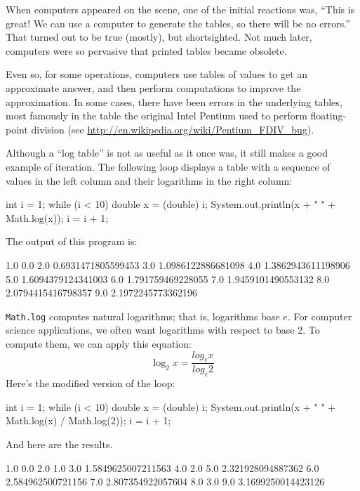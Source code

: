 \documentclass[12pt]{book}
\theoremstyle{exercise}
\newcommand{\java}[1]{\verb"#1"}
\begin{document}
When computers appeared on the scene, one of the initial reactions was, ``This is great!
We can use a computer to generate the tables, so there will be no errors.''
That turned out to be true (mostly), but shortsighted.
Not much later, computers were so pervasive that printed tables became obsolete.


Even so, for some operations, computers use tables of values to get an approximate answer, and then perform computations to improve the approximation.
In some cases, there have been errors in the underlying tables, most famously in the table the original Intel Pentium used to perform floating-point division (see \url{http://en.wikipedia.org/wiki/Pentium_FDIV_bug}).

Although a ``log table'' is not as useful as it once was, it still makes a good example of iteration.
The following loop displays a table with a sequence of values in the left column and their logarithms in the right column:

\begin{code}
    int i = 1;
    while (i < 10) {
        double x = (double) i;
        System.out.println(x + "   " + Math.log(x));
        i = i + 1;
    }
\end{code}

The output of this program is:

\begin{stdout}
1.0   0.0
2.0   0.6931471805599453
3.0   1.0986122886681098
4.0   1.3862943611198906
5.0   1.6094379124341003
6.0   1.791759469228055
7.0   1.9459101490553132
8.0   2.0794415416798357
9.0   2.1972245773362196
\end{stdout}

\java{Math.log} computes natural logarithms; that is, logarithms base $e$.
For computer science applications, we often want logarithms with respect to base 2.
To compute them, we can apply this equation:
%
\[ \log_2 x = \frac{log_e x}{log_e 2} \]
%
Here's the modified version of the loop:

\begin{code}
    int i = 1;
    while (i < 10) {
        double x = (double) i;
        System.out.println(x + "   " + Math.log(x) / Math.log(2));
        i = i + 1;
    }
\end{code}

And here are the results.

\begin{stdout}
1.0   0.0
2.0   1.0
3.0   1.5849625007211563
4.0   2.0
5.0   2.321928094887362
6.0   2.584962500721156
7.0   2.807354922057604
8.0   3.0
9.0   3.1699250014423126
\end{stdout}
\end{document}
